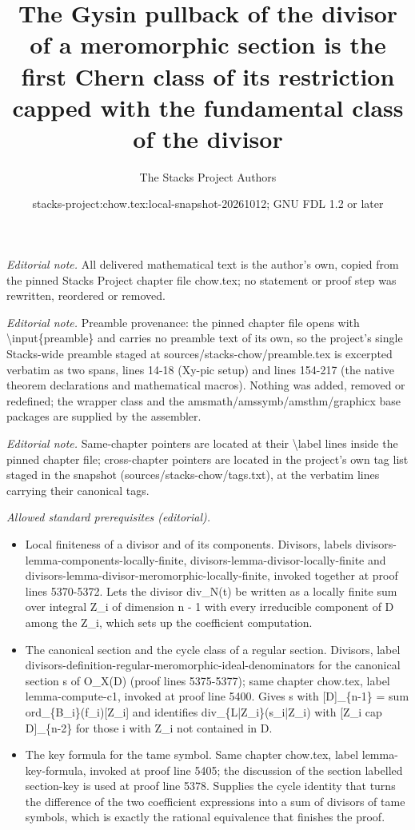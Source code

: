 \documentclass[10pt,a4paper]{amsart}
\title{The Gysin pullback of the divisor of a meromorphic section is the first Chern class of its restriction capped with the fundamental class of the divisor}
\author{The Stacks Project Authors}
\date{stacks-project:chow.tex:local-snapshot-20261012; GNU FDL 1.2 or later}
\theoremstyle{plain}
\theoremstyle{definition}
\theoremstyle{remark}
\numberwithin{equation}{subsection}
\begin{document}
\maketitle
\noindent\textit{Editorial note.} All delivered mathematical text is the author's own, copied from the pinned Stacks Project chapter file chow.tex; no statement or proof step was rewritten, reordered or removed.\par\medskip
\noindent\textit{Editorial note.} Preamble provenance: the pinned chapter file opens with \textbackslash{}input\{preamble\} and carries no preamble text of its own, so the project's single Stacks-wide preamble staged at sources/stacks-chow/preamble.tex is excerpted verbatim as two spans, lines 14-18 (Xy-pic setup) and lines 154-217 (the native theorem declarations and mathematical macros). Nothing was added, removed or redefined; the wrapper class and the amsmath/amssymb/amsthm/graphicx base packages are supplied by the assembler.\par\medskip
\noindent\textit{Editorial note.} Same-chapter pointers are located at their \textbackslash{}label lines inside the pinned chapter file; cross-chapter pointers are located in the project's own tag list staged in the snapshot (sources/stacks-chow/tags.txt), at the verbatim lines carrying their canonical tags.\par\medskip
\noindent\textit{Allowed standard prerequisites (editorial).}\begin{itemize}
\item Local finiteness of a divisor and of its components. Divisors, labels divisors-lemma-components-locally-finite, divisors-lemma-divisor-locally-finite and divisors-lemma-divisor-meromorphic-locally-finite, invoked together at proof lines 5370-5372. Lets the divisor div\_N(t) be written as a locally finite sum over integral Z\_i of dimension n - 1 with every irreducible component of D among the Z\_i, which sets up the coefficient computation.
\item The canonical section and the cycle class of a regular section. Divisors, label divisors-definition-regular-meromorphic-ideal-denominators for the canonical section s of O\_X(D) (proof lines 5375-5377); same chapter chow.tex, label lemma-compute-c1, invoked at proof line 5400. Gives s with [D]\_\{n-1\} = sum ord\_\{B\_i\}(f\_i)[Z\_i] and identifies div\_\{L|Z\_i\}(s\_i|Z\_i) with [Z\_i cap D]\_\{n-2\} for those i with Z\_i not contained in D.
\item The key formula for the tame symbol. Same chapter chow.tex, label lemma-key-formula, invoked at proof line 5405; the discussion of the section labelled section-key is used at proof line 5378. Supplies the cycle identity that turns the difference of the two coefficient expressions into a sum of divisors of tame symbols, which is exactly the rational equivalence that finishes the proof.
\end{itemize}\medskip
\end{document}
